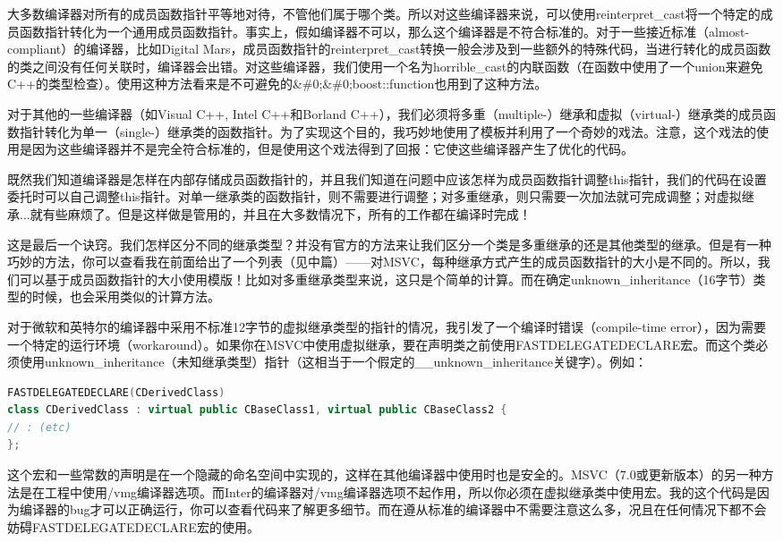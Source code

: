 \documentclass{article}
\begin{document}
\begin{CJK}{UTF8}{gbsn}
大多数编译器对所有的成员函数指针平等地对待，不管他们属于哪个类。所以对这些编译器来说，可以使用reinterpret\_cast将一个特定的成员函数指针转化为一个通用成员函数指针。事实上，假如编译器不可以，那么这个编译器是不符合标准的。对于一些接近标准（almost-compliant）的编译器，比如Digital Mars，成员函数指针的reinterpret\_cast转换一般会涉及到一些额外的特殊代码，当进行转化的成员函数的类之间没有任何关联时，编译器会出错。对这些编译器，我们使用一个名为horrible\_cast的内联函数（在函数中使用了一个union来避免C++的类型检查）。使用这种方法看来是不可避免的\&\#0;\&\#0;boost::function也用到了这种方法。

对于其他的一些编译器（如Visual C++, Intel C++和Borland C++），我们必须将多重（multiple-）继承和虚拟（virtual-）继承类的成员函数指针转化为单一（single-）继承类的函数指针。为了实现这个目的，我巧妙地使用了模板并利用了一个奇妙的戏法。注意，这个戏法的使用是因为这些编译器并不是完全符合标准的，但是使用这个戏法得到了回报：它使这些编译器产生了优化的代码。

既然我们知道编译器是怎样在内部存储成员函数指针的，并且我们知道在问题中应该怎样为成员函数指针调整this指针，我们的代码在设置委托时可以自己调整this指针。对单一继承类的函数指针，则不需要进行调整；对多重继承，则只需要一次加法就可完成调整；对虚拟继承...就有些麻烦了。但是这样做是管用的，并且在大多数情况下，所有的工作都在编译时完成！

这是最后一个诀窍。我们怎样区分不同的继承类型？并没有官方的方法来让我们区分一个类是多重继承的还是其他类型的继承。但是有一种巧妙的方法，你可以查看我在前面给出了一个列表（见中篇）——对MSVC，每种继承方式产生的成员函数指针的大小是不同的。所以，我们可以基于成员函数指针的大小使用模版！比如对多重继承类型来说，这只是个简单的计算。而在确定unknown\_inheritance（16字节）类型的时候，也会采用类似的计算方法。

对于微软和英特尔的编译器中采用不标准12字节的虚拟继承类型的指针的情况，我引发了一个编译时错误（compile-time error），因为需要一个特定的运行环境（workaround）。如果你在MSVC中使用虚拟继承，要在声明类之前使用FASTDELEGATEDECLARE宏。而这个类必须使用unknown\_inheritance（未知继承类型）指针（这相当于一个假定的\_\_unknown\_inheritance关键字）。例如：
\begin{lstlisting}[language=c++]
FASTDELEGATEDECLARE(CDerivedClass)
class CDerivedClass : virtual public CBaseClass1, virtual public CBaseClass2 {
// : (etc)
};
\end{lstlisting}
这个宏和一些常数的声明是在一个隐藏的命名空间中实现的，这样在其他编译器中使用时也是安全的。MSVC（7.0或更新版本）的另一种方法是在工程中使用/vmg编译器选项。而Inter的编译器对/vmg编译器选项不起作用，所以你必须在虚拟继承类中使用宏。我的这个代码是因为编译器的bug才可以正确运行，你可以查看代码来了解更多细节。而在遵从标准的编译器中不需要注意这么多，况且在任何情况下都不会妨碍FASTDELEGATEDECLARE宏的使用。


\end{CJK}
\end{document}
